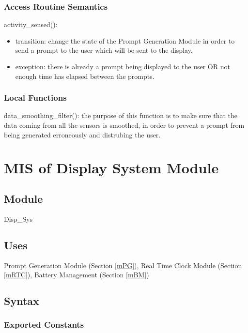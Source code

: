 \documentclass[12pt, titlepage]{article}
\begin{document}
\subsubsection{Access Routine Semantics}

\noindent activity\_sensed():
\begin{itemize}
\item transition: change the state of the Prompt Generation Module in order to send a prompt to the user which will be sent to the display.  
\item exception: there is already a prompt being displayed to the user OR not enough time has elapsed between the prompts.
\end{itemize}

\subsubsection{Local Functions}

data\_smoothing\_filter(): the purpose of this function is to make sure that the data coming from all the sensors is smoothed, in order to prevent a prompt from being generated erroneously and distrubing the user.

\newpage



\section{MIS of Display System Module} \label{mDS_2} 

\subsection{Module}

Disp\_Sys

\subsection{Uses}

Prompt Generation Module (Section \ref{mPG}), Real Time Clock Module (Section \ref{mRTC}), Battery Management (Section \ref{mBM})

\subsection{Syntax}

\subsubsection{Exported Constants}
\end{document}
